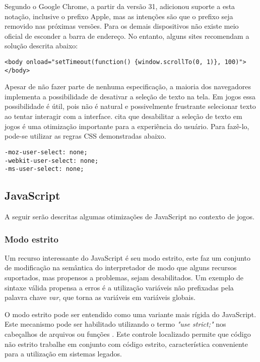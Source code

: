 Segundo \citet{homescreenwebapps} o Google Chrome, a partir da versão
31, adicionou suporte a esta notação, inclusive o prefixo Apple, mas
as intenções são que o prefixo seja removido nas próximas versões.
Para os demais dispositivos não existe meio oficial de esconder a
barra de endereço. No entanto, alguns sites recomendam a solução
descrita abaixo:

\begin{verbatim}
<body onload="setTimeout(function() {window.scrollTo(0, 1)}, 100)">
</body>
\end{verbatim}

Apesar de não fazer parte de nenhuma especificação, a maioria dos
navegadores implementa a possibilidade de desativar a seleção de texto
na tela. Em jogos essa possibilidade é útil, pois não é natural e
possivelmente frustrante selecionar texto ao tentar interagir com a
interface. \citet{html5mostwanted} cita que desabilitar a seleção de
texto em jogos é uma otimização importante para a experiência do
usuário. Para fazê-lo, pode-se utilizar as regras CSS demonstradas
abaixo.

\begin{verbatim}
-moz-user-select: none;
-webkit-user-select: none;
-ms-user-select: none;
\end{verbatim}

\subsection{JavaScript}

A seguir serão descritas algumas otimizações de JavaScript no
contexto de jogos.

\subsubsection{Modo estrito}

Um recurso interessante do JavaScript é seu modo estrito, este faz
um conjunto de modificação na semântica do interpretador de modo
que alguns recursos suportados, mas propensos a problemas, sejam
desabilitados. Um exemplo de sintaxe válida propensa a erros é a
utilização variáveis não prefixadas pela palavra chave \textit{var},
que torna as variáveis em variáveis globais.

O modo estrito pode ser entendido como uma variante mais rígida do
JavaScript. Este mecanismo pode ser habilitado utilizando o termo
\textit{"use strict;"} nos cabeçalhos de arquivos ou funções .
Este controle localizado permite que código não estrito trabalhe
em conjunto com código estrito, característica conveniente para a
utilização em sistemas legados.

